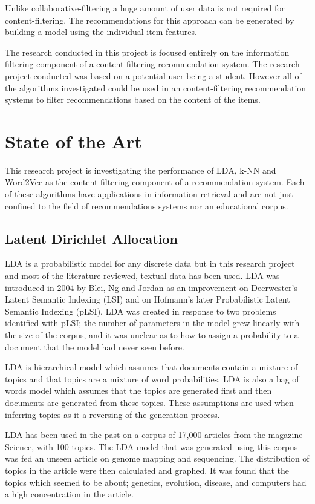 Unlike collaborative-filtering a huge amount of user data is not required for content-filtering.
The recommendations for this approach can be generated by building a model using the individual item features.

The research conducted in this project is focused entirely on the information filtering component of a content-filtering recommendation system.
The research project conducted was based on a potential user being a student.
However all of the algorithms investigated could be used in an content-filtering recommendation systems to filter recommendations based on the content of the items.

\section{State of the Art}
This research project is investigating the performance of LDA, k-NN and Word2Vec as the content-filtering component of a recommendation system.
Each of these algorithms have applications in information retrieval and are not just confined to the field of recommendations systems nor an educational corpus.

\subsection{Latent Dirichlet Allocation}
LDA is a probabilistic model for any discrete data but in this research project and most of the literature reviewed, textual data has been used.
LDA was introduced in 2004 by Blei, Ng and Jordan as an improvement on Deerwester's Latent Semantic Indexing (LSI) and on Hofmann's later Probabilistic Latent Semantic Indexing (pLSI).
LDA was created in response to two problems identified with pLSI; the number of parameters in the model grew linearly with the size of the corpus, and it was unclear as to how to assign a probability to a document that the model had never seen before\cite{LDAintro}.

LDA is hierarchical model which assumes that documents contain a mixture of topics and that topics are a mixture of word probabilities.
LDA is also a bag of words model which assumes that the topics are generated first and then documents are generated from these topics.
These assumptions are used when inferring topics as it a reversing of the generation process\cite{LDAintro}.

LDA has been used in the past on a corpus of 17,000 articles from the magazine Science, with 100 topics.
The LDA model that was generated using this corpus was fed an unseen article on genome mapping and sequencing.
The distribution of topics in the article were then calculated and graphed.
It was found that the topics which seemed to be about; genetics, evolution, disease, and computers had a high concentration in the article\cite{ACMTopicModel}.

